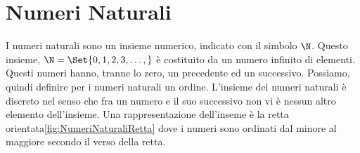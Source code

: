 \chapter{Numeri Naturali}
\label{cha:NumeriNaturali}
I numeri naturali sono un insieme numerico, indicato con il simbolo $\N$. Questo insieme, $\N=\Set{0,1,2,3,\dots,}$ è  costituito da un numero infinito di elementi. Questi numeri hanno, tranne lo zero, un precedente ed un successivo. Possiamo, quindi definire per i numeri naturali un ordine.  L'insieme dei numeri naturali è discreto nel senso che fra un numero e il suo successivo non vi è nessun altro elemento dell'insieme. Una rappresentazione dell'inseme  è la retta orientata\nobs\vref{fig:NumeriNaturaliRetta} dove i numeri sono ordinati dal minore al maggiore secondo il verso della retta. 
